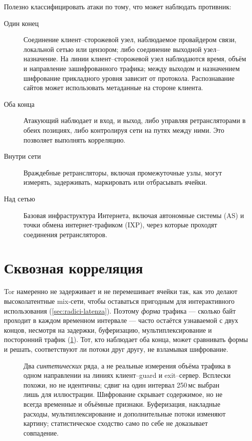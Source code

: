 Полезно классифицировать атаки по тому, что может наблюдать противник:
\begin{description}
  \item[Один конец] Соединение клиент--сторожевой узел, наблюдаемое провайдером связи, локальной сетью или цензором; либо соединение выходной узел--назначение. На линии клиент--сторожевой узел наблюдаются время, объём и направление зашифрованного трафика; между выходом и назначением шифрование прикладного уровня зависит от протокола. Распознавание сайтов может использовать метаданные на стороне клиента.
  \item[Оба конца] Атакующий наблюдает и вход, и выход, либо управляя ретрансляторами в обеих позициях, либо контролируя сети на путях между ними. Это позволяет выполнять корреляцию.
  \item[Внутри сети] Враждебные ретрансляторы, включая промежуточные узлы, могут измерять, задерживать, маркировать или отбрасывать ячейки.
  \item[Над сетью] Базовая инфраструктура Интернета, включая автономные системы (AS) и точки обмена интернет-трафиком (IXP), через которые проходят соединения ретрансляторов.
\end{description}

\section{Сквозная корреляция}\label{sec:att-correlazione}

Tor намеренно не задерживает и не перемешивает ячейки так, как это делают высоколатентные mix-сети, чтобы оставаться пригодным для интерактивного использования (\cref{sec:radici-latenza}). Поэтому \emph{форма} трафика — сколько байт проходит в каждом временном интервале — часто остаётся узнаваемой с двух концов, несмотря на задержки, буферизацию, мультиплексирование и посторонний трафик (\cref{fig:correlazione}). Тот, кто наблюдает оба конца, может сравнивать формы и решать, соответствуют ли потоки друг другу, не взламывая шифрование.

\begin{figure}[htbp]
\centering

\caption{Два \emph{синтетических} ряда, а не реальные измерения объёма трафика в одном направлении на линиях клиент--guard и exit--сервер. Всплески похожи, но не идентичны; сдвиг на один интервал 250\,мс выбран лишь для иллюстрации. Шифрование скрывает содержимое, но не всегда временные и объёмные признаки. Буферизация, накладные расходы, мультиплексирование и дополнительные потоки изменяют картину; статистическое сходство само по себе не доказывает совпадение.}
\label{fig:correlazione}
\end{figure}

